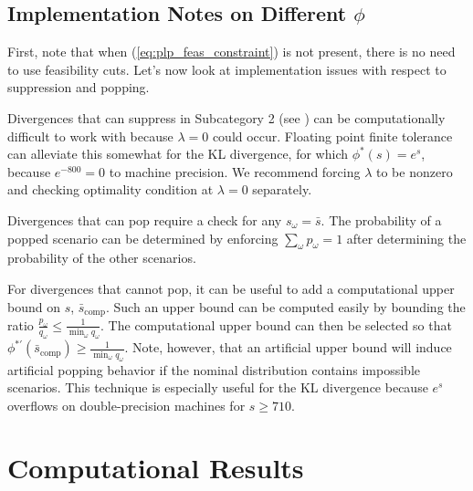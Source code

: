 \documentclass[opre,nonblindrev]{informs3} %
\begin{document}
\subsection{Implementation Notes on Different $\phi$}
\label{ssec:implement}

First, note that when (\ref{eq:plp_feas_constraint}) is not present, there is no need to use feasibility cuts. Let's now look at implementation issues with respect to suppression and popping. 

Divergences that can suppress in Subcategory 2 (see \cite{love2013phi}) can be computationally difficult to work with because $\lambda = 0$ could occur.
Floating point finite tolerance can alleviate this somewhat for the KL divergence, for which $\phi^*(s) = e^s$, because $e^{-800} = 0$ to machine precision.
We recommend forcing $\lambda$ to be nonzero and checking optimality condition at $\lambda = 0$ separately.

Divergences that can pop require a check for any $s_\omega = \bar{s}$.
The probability of a popped scenario can be determined by enforcing $\sum_\omega p_\omega = 1$ after determining the probability of the other scenarios.

For divergences that cannot pop, it can be useful to add a computational upper bound on $s$, $\bar{s}_\text{comp}$.
Such an upper bound can be computed easily by bounding the ratio $\frac{p_\omega}{q_\omega} \leq \frac{1}{\min_\omega q_\omega}$.
The computational upper bound can then be selected so that $\phi^{*\prime}(\bar{s}_\text{comp}) \geq \frac{1}{\min_\omega q_\omega}$.
Note, however, that an artificial upper bound will induce artificial popping behavior if the nominal distribution contains impossible scenarios.
This technique is especially useful for the KL divergence because $e^s$ overflows on double-precision machines for $s \geq 710$.



\section{Computational Results}
\label{sec:comp}
\end{document}
